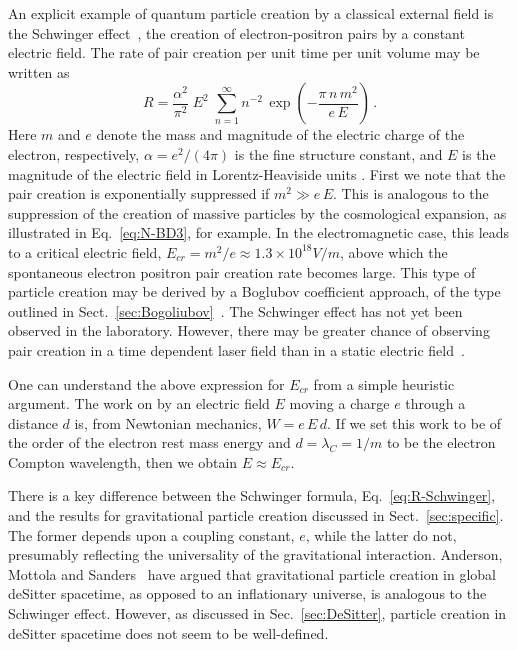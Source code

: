 \documentclass[12pt,onecolumn,eqsecnum,floats,aps,prd,floatfix,titlepage,tightenlines]{revtex4-2}
\begin{document}
An explicit example of quantum particle creation by a classical external field is the Schwinger effect~\cite{Schwinger},
the creation of electron-positron pairs by a constant electric field. The rate of pair creation per unit time per unit 
volume may be written as
\begin{equation}
R = \frac{\alpha^2}{\pi^2}\; E^2\; \sum_{n=1}^\infty n^{-2}\, \exp\left(-\frac{\pi\, n\, m^2}{e\, E} \right)\,.
\label{eq:R-Schwinger} 
 \end{equation}
Here $m$ and $e$ denote the mass and magnitude of the electric charge of the electron, respectively, $\alpha = e^2/(4 \pi)$ is the fine structure
constant, and $E$ is the magnitude of the electric field in Lorentz-Heaviside units . First we note that the pair creation is exponentially suppressed if $m^2 \gg e\, E$.
This is analogous to the suppression of the creation of massive particles by the cosmological expansion, as illustrated in Eq.~\eqref{eq:N-BD3},
for example.  In the electromagnetic case, this leads to a critical electric field, $E_{cr} = m^2/e \approx  1.3 \times 10^{18} V/m$, above which the spontaneous 
electron positron pair  creation rate becomes large. This type of particle creation may be derived by a Boglubov coefficient approach, of the type outlined in
Sect.~\ref{sec:Bogoliubov}~\cite{Grib94}. The Schwinger effect has not yet been observed in the laboratory. However, there may be greater chance of
observing pair  creation in a time dependent laser field than in a static electric field~\cite{Dunne09}.

One can understand the above expression for $E_{cr}$ from a simple heuristic argument. The work on by an electric field $E$ moving a charge
$e$ through a distance $d$ is, from Newtonian mechanics, $W = e\, E\, d$. If we set this work to be of the order of the electron rest mass energy
and $d =\lambda_C = 1/m$ to be the electron Compton wavelength, then we obtain $E\approx E_{cr}$.

There is a key difference between the Schwinger formula, Eq.~\eqref{eq:R-Schwinger}, and the results for gravitational particle creation discussed
in Sect.~\ref{sec:specific}. The former depends upon a coupling constant, $e$, while the latter do not, presumably reflecting the universality of the
gravitational  interaction. Anderson, Mottola and Sanders~\cite{AM14,AMS18}   have argued that gravitational particle creation in global deSitter spacetime, 
as opposed to an inflationary universe, is analogous to the Schwinger effect. However, as discussed in Sec.~\ref{sec:DeSitter}, particle creation in  
deSitter spacetime does not seem to be well-defined.
 
\end{document}
